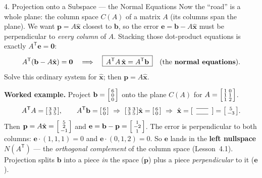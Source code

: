 \documentclass[10pt]{article}
\newcommand{\xx}{\mathbf{x}}
\newcommand{\bb}{\mathbf{b}}
\newcommand{\pp}{\mathbf{p}}
\newcommand{\ee}{\mathbf{e}}
\newcommand{\zero}{\mathbf{0}}
\newcommand{\T}{\mathsf{T}}
\begin{document}
\begin{notesbox}{4. Projection onto a Subspace --- the Normal Equations}
Now the ``road'' is a whole plane: the column space $C(A)$ of a matrix $A$ (its columns span the plane).
We want $\pp=A\hat{\xx}$ closest to $\bb$, so the error $\ee=\bb-A\hat{\xx}$ must be perpendicular to
\emph{every column} of $A$. Stacking those dot-product equations is exactly $A^{\T}\ee=\zero$:
\[
  A^{\T}(\bb-A\hat{\xx})=\zero \quad\Longrightarrow\quad
  \boxed{\,A^{\T}A\,\hat{\xx}=A^{\T}\bb\,}\quad\text{(the \textbf{normal equations}).}
\]
Solve this ordinary system for $\hat{\xx}$; then $\pp=A\hat{\xx}$.

\vspace{3pt}
\textbf{Worked example.} Project $\bb=\begin{bsmallmatrix} 6\\0\\0 \end{bsmallmatrix}$ onto the plane
$C(A)$ for $A=\begin{bsmallmatrix} 1 & 0\\ 1 & 1\\ 1 & 2 \end{bsmallmatrix}$.
\[
  A^{\T}A=\begin{bsmallmatrix} 3 & 3\\ 3 & 5 \end{bsmallmatrix},\qquad
  A^{\T}\bb=\begin{bsmallmatrix} 6\\ 0 \end{bsmallmatrix}\ \Rightarrow\
  \begin{bsmallmatrix} 3 & 3\\ 3 & 5 \end{bsmallmatrix}\hat{\xx}=\begin{bsmallmatrix} 6\\ 0 \end{bsmallmatrix}
  \ \Rightarrow\ \hat{\xx}=\begin{bsmallmatrix}\ \blank{0.6cm}\ \\[2pt] \blank{0.6cm} \end{bsmallmatrix}=\begin{bsmallmatrix} 5\\ -3 \end{bsmallmatrix}.
\]
Then $\pp=A\hat{\xx}=\begin{bsmallmatrix} 5\\ 2\\ -1 \end{bsmallmatrix}$ and
$\ee=\bb-\pp=\begin{bsmallmatrix} 1\\ -2\\ 1 \end{bsmallmatrix}$. The error is perpendicular to both
columns: $\ee\cdot(1,1,1)=0$ and $\ee\cdot(0,1,2)=0$. So $\ee$ lands in the \textbf{left nullspace}
$N(A^{\T})$ --- the \emph{orthogonal complement} of the column space (Lesson~4.1). Projection splits
$\bb$ into a piece \emph{in} the space ($\pp$) plus a piece \emph{perpendicular} to it ($\ee$).
\end{notesbox}
\end{document}
